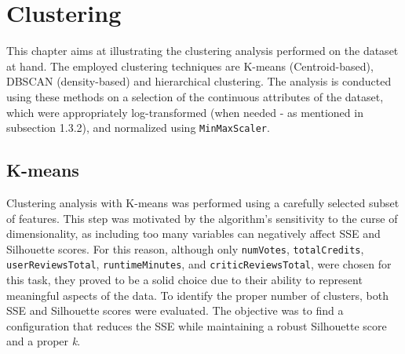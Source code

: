 \chapter{Clustering}
\label{ch:capitolo2}

This chapter aims at illustrating the clustering analysis performed on the dataset at hand.
The employed clustering techniques are K-means (Centroid-based), DBSCAN (density-based) and hierarchical clustering.
The analysis is conducted using these methods on a selection of the continuous attributes of the dataset, 
which were appropriately log-transformed (when needed - as mentioned in subsection 1.3.2), and normalized using \texttt{MinMaxScaler}. 



\section{K-means}\label{sec:centroid_based}

Clustering analysis with K-means was performed using a carefully selected subset of features. 
This step was motivated by the algorithm's sensitivity to the curse of dimensionality, as including too many variables can negatively affect SSE and Silhouette scores.
For this reason, although only \texttt{numVotes}, \texttt{totalCredits}, \texttt{userReviewsTotal}, \texttt{runtimeMinutes}, and \texttt{criticReviewsTotal},
were chosen for this task, they proved to be a solid choice due to their ability to represent meaningful aspects of the data.
To identify the proper number of clusters, both SSE and Silhouette scores were evaluated. 
The objective was to find a configuration that reduces the SSE while maintaining a robust Silhouette score and a proper \textit{k}. \\

